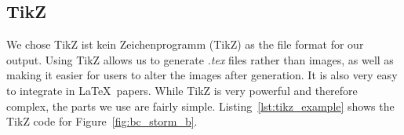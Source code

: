 \subsection*{TikZ}
We chose TikZ ist kein Zeichenprogramm (TikZ) as the file format for our output.
Using TikZ allows us to generate \textit{.tex} files rather than images, as well as making it easier for users to alter the images after generation.
It is also very easy to integrate in \LaTeX\ papers.
While TikZ is very powerful and therefore complex, the parts we use are fairly simple.
Listing~\ref{lst:tikz_example} shows the TikZ code for Figure~\ref{fig:bc_storm_b}.
